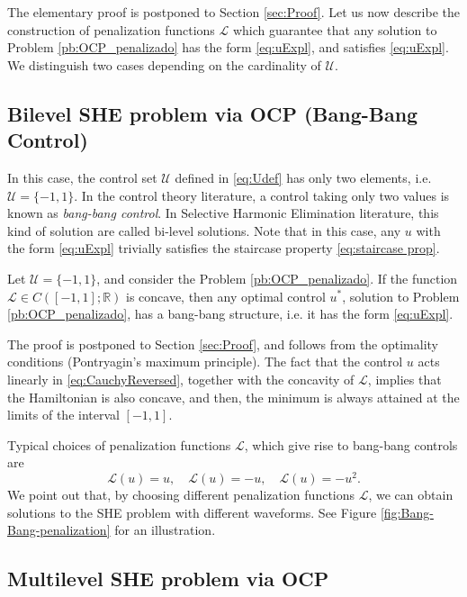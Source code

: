 \documentclass[twocolumn]{autart}    %
\begin{document}
The elementary proof is postponed to Section \ref{sec:Proof}. 
Let us now describe the construction of penalization functions $\mathcal{L}$ which guarantee that any solution to Problem \ref{pb:OCP_penalizado} has the form \eqref{eq:uExpl}, and satisfies  \eqref{eq:uExpl}. We distinguish two cases depending on the cardinality of $\mathcal{U}$.


\subsection{Bilevel SHE problem via OCP (Bang-Bang Control)} 

In this case, the control set $\mathcal{U}$ defined in \eqref{eq:Udef} has only two elements, i.e.  $\mathcal{U}=\{-1,1\}$.
In the control theory literature, a control taking only two values is known as \emph{bang-bang control}.  In Selective Harmonic Elimination literature, this kind of solution are called bi-level solutions.
Note that in this case, any $u$ with the form \eqref{eq:uExpl}  trivially satisfies the staircase property \eqref{eq:staircase prop}.

\bigskip

\begin{theorem}\label{th:bang-bang}
Let $\mathcal{U}=\{ -1, 1\}$, and consider the Problem \ref{pb:OCP_penalizado}. If the function $\mathcal{L}\in C([-1,1];\mathbb{R})$ is concave, then any optimal control $u^\ast$, solution to Problem \ref{pb:OCP_penalizado}, has a bang-bang structure, i.e. it has the form \eqref{eq:uExpl}.
\end{theorem}

The proof is postponed to Section \ref{sec:Proof}, and follows from the optimality conditions (Pontryagin's maximum principle).   The fact that the  control $u$ acts linearly in \eqref{eq:CauchyReversed}, together with the concavity of $\mathcal{L}$, implies that the Hamiltonian is also concave, and then, the minimum is always attained at the limits of the interval $[-1,1]$.

Typical choices of penalization functions $\mathcal{L}$, which give rise to bang-bang controls are
$$\mathcal{L}(u) = u,  \quad \mathcal{L}(u) = -u,  \quad \mathcal{L}(u) = -u^2.$$
We point out that, by choosing different penalization functions $\mathcal{L}$, we can obtain solutions to the SHE problem with different waveforms.
See Figure \ref{fig:Bang-Bang-penalization} for an illustration.



\subsection{Multilevel SHE problem via OCP}
\end{document}
